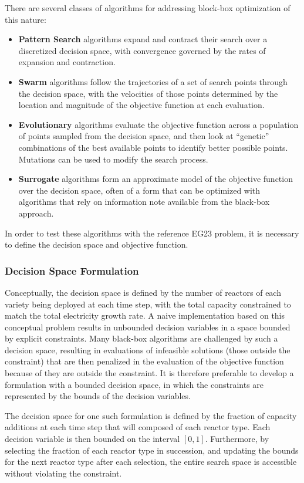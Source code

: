 There are several classes of algorithms for addressing block-box optimization
of this nature:
\begin{itemize}
\item \textbf{Pattern Search} algorithms expand and contract their search over
  a discretized decision space, with convergence governed by the rates of expansion and
  contraction.
\item \textbf{Swarm} algorithms follow the trajectories of a set of search
  points through the decision space, with the velocities of those points
  determined by the location and magnitude of the objective function at each
  evaluation.
\item \textbf{Evolutionary} algorithms evaluate the objective function across
  a population of points sampled from the decision space, and then look at
  ``genetic'' combinations of the best available points to identify better
  possible points.  Mutations can be used to modify the search process.
\item \textbf{Surrogate} algorithms form an approximate model of the objective
  function over the decision space, often of a form that can be optimized with
  algorithms that rely on information note available from the black-box
  approach.
\end{itemize}

In order to test these algorithms with the reference EG23 problem, it is
necessary to define the decision space and objective function.

\subsubsection{Decision Space Formulation}

Conceptually, the decision space is defined by the number of reactors of each
variety being deployed at each time step, with the total capacity constrained
to match the total electricity growth rate.  A naive implementation based on
this conceptual problem results in unbounded decision variables in a space
bounded by explicit constraints.  Many black-box algorithms are challenged by
such a decision space, resulting in evaluations of infeasible solutions (those
outside the constraint) that are then penalized in the evaluation of the
objective function because of they are outside the constraint.  It is
therefore preferable to develop a formulation with a bounded decision space,
in which the constraints are represented by the bounds of the decision
variables.

The decision space for one such formulation is defined by the fraction of
capacity additions at each time step that will composed of each reactor type.
Each decision variable is then bounded on the interval $[0,1]$.  Furthermore,
by selecting the fraction of each reactor type in succession, and updating the
bounds for the next reactor type after each selection, the entire search space
is accessible without violating the constraint.

